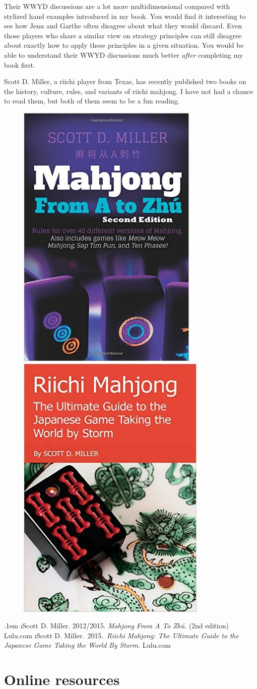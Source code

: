 \bigskip
Their WWYD discussions are a lot more multidimensional compared with stylized hand examples introduced in my book. You would find it interesting to see how Jenn and Garthe often disagree about what they would discard. Even those players who share a similar view on strategy principles can still disagree about exactly how to apply these principles in a given situation. 
You would be able to understand their WWYD discussions much better \emph{after} completing my book first. 

\bigskip
Scott D. Miller, a riichi player from Texas, has recently published two books on the history, culture, rules, and variants of riichi mahjong. I have not had a chance to read them, but both of them seem to be a fun reading. 

\vspace{-2pt}
\begin{figure}[h]\centering
\includegraphics[height=.34\textwidth,clip]{figs/miller1}
\includegraphics[height=.34\textwidth,clip]{figs/miller2}
\end{figure}
\vspace{-15pt}
\be\itemsep.1em \setcounter{enumi}{5}
\i Scott D. Miller. 2012/2015. \textit{Mahjong From A To Zh\'{u}.} (2nd edition) Lulu.com
\i Scott D. Miller.~2015.~\textit{Riichi Mahjong: The Ultimate Guide to the Japanese Game Taking the World By Storm.} Lulu.com
\ee


\newpage
\section{Online resources}

